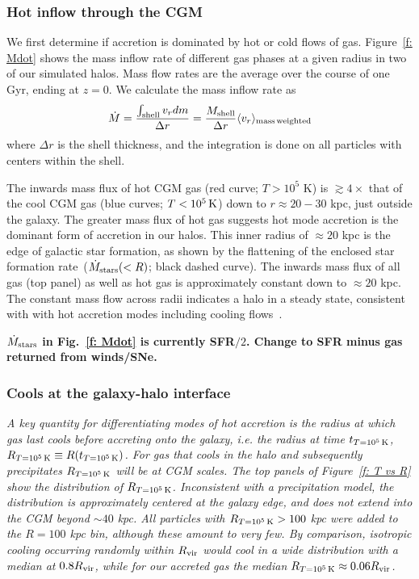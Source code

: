 \documentclass[fleqn,usenatbib]{mnras}
\newcommand{\Rcon}{R_{T=10^5\,{\rm K}}}
\newcommand{\tcon}{t_{T=10^5\,{\rm K}}}
\newcommand{\Mdot}{\dot{M}}
\begin{document}
\subsubsection{Hot inflow through the CGM}
\label{s: characteristics -- inflowing gas phase}

We first determine if accretion is dominated by hot or cold flows of gas.
Figure~\ref{f: Mdot} shows the mass inflow rate of different gas phases at a given radius in two of our simulated halos.
Mass flow rates are the average over the course of one Gyr, ending at $z=0$.
We calculate the mass inflow rate as
\begin{equation}
     \Mdot = \frac{\int_{\rm shell} v_r dm}{\Delta r} = \frac{M_{\rm shell}}{\Delta r} \langle v_r\rangle_{\rm mass\, weighted}
     \label{e: Mdot}
\end{equation}
where $\Delta r$ is the shell thickness, and the integration is done on all particles with centers within the shell.

The inwards mass flux of hot CGM gas (red curve; $T>10^5$ K)  is $\gtrsim 4\times$ that of the cool CGM gas (blue curves; $T < 10^5\,{\rm K}$) down to $r \approx 20-30$ kpc, just outside the galaxy.
The greater mass flux of hot gas suggests hot mode accretion is the dominant form of accretion in our halos.
This inner radius of $\approx 20$ kpc is the edge of galactic star formation, as shown by the flattening of the enclosed star formation rate~($\dot M_{\rm stars}(<R)$; black dashed curve).
The inwards mass flux of all gas (top panel) as well as hot gas is approximately constant down to $\approx 20$ kpc.
The constant mass flow across radii indicates a halo in a steady state, consistent with with hot accretion modes including cooling flows~\citep{Stern2019}.

\textbf{$\dot{M}_{\rm stars}$ in Fig.~\ref{f: Mdot} is currently SFR$/2$. Change to SFR minus gas returned from winds/SNe.}

\subsubsection{Cools at the galaxy-halo interface}
\label{s: characteristics -- cools}

\textit{
A key quantity for differentiating modes of hot accretion is the radius at which gas last cools before accreting onto the galaxy, i.e. the radius at time $\tcon$, $\Rcon \equiv R (\tcon)$.
For gas that cools in the halo and subsequently precipitates $\Rcon$ will be at CGM scales.
The top panels of Figure~\ref{f: T vs R} show the distribution of  $\Rcon$.
Inconsistent with a precipitation model, the distribution is approximately centered at the galaxy edge, and does not extend into the CGM beyond $\sim 40$ kpc.
All particles with $\Rcon>100$ kpc were added to the $R=100$ kpc bin, although these amount to very few.
By comparison, isotropic cooling occurring randomly within $R_{\rm vir}$ would cool in a wide distribution with a median at $0.8 R_{\rm vir}$, while for our accreted gas the median $\Rcon \approx 0.06 R_{\rm vir}$.
}
\end{document}
